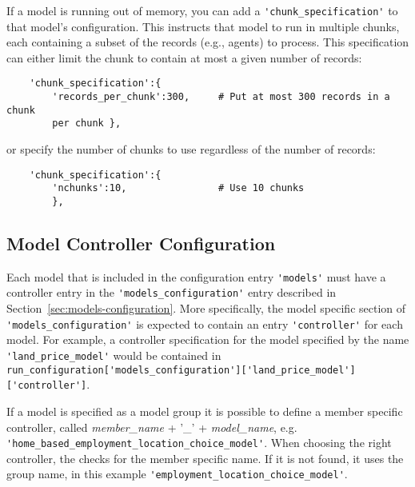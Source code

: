 If a model is running out of memory, you can add a \verb|'chunk_specification'|
to that model's configuration. 
 This instructs that model to run in
multiple chunks, each containing a subset of the records (e.g., agents) to
process. This specification can either limit the chunk to contain at most a
given number of records:

\begin{verbatim}
    'chunk_specification':{
        'records_per_chunk':300,     # Put at most 300 records in a chunk
        per chunk },
\end{verbatim}

or specify the number of chunks to use regardless of the number of records:

\begin{verbatim}
    'chunk_specification':{
        'nchunks':10,                # Use 10 chunks
        },
\end{verbatim}

\subsection{Model Controller Configuration}
\label{sec:model-controller-configuration}
%
Each model that is included in the configuration entry \verb|'models'| must have a
controller entry in the \verb|'models_configuration'| entry described in
Section~\ref{sec:models-configuration}.  More specifically, the model specific
section of \verb|'models_configuration'| is expected to contain an entry \verb|'controller'|
for each model. For example, a controller specification for the model
specified by the name \verb|'land_price_model'| would be contained in\\
\verb|run_configuration['models_configuration']['land_price_model']['controller']|.

If a model is specified as a model group  it is possible to define a member specific controller, called 
{\em member_name} + '_' + {\em model_name}, e.g. \verb|'home_based_employment_location_choice_model'|.
When choosing the right controller, the  checks for the member specific name. If it is not found,
it uses the group name, in this example \verb|'employment_location_choice_model'|.

